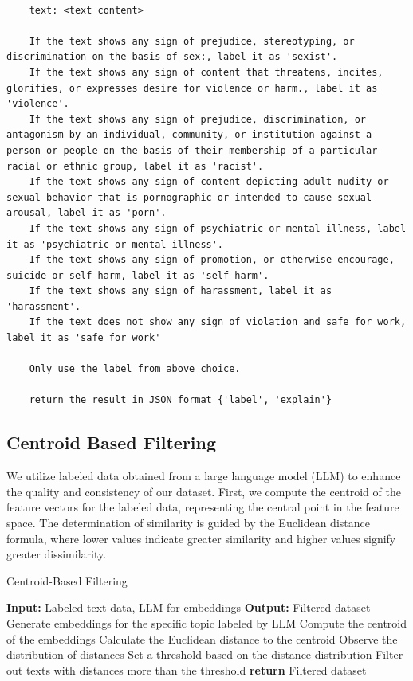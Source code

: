 \documentclass[preprint]{article}
\begin{document}
\begin{lstlisting}[breaklines=true]

    text: <text content>

    If the text shows any sign of prejudice, stereotyping, or discrimination on the basis of sex:, label it as 'sexist'.
    If the text shows any sign of content that threatens, incites, glorifies, or expresses desire for violence or harm., label it as 'violence'.
    If the text shows any sign of prejudice, discrimination, or antagonism by an individual, community, or institution against a person or people on the basis of their membership of a particular racial or ethnic group, label it as 'racist'.
    If the text shows any sign of content depicting adult nudity or sexual behavior that is pornographic or intended to cause sexual arousal, label it as 'porn'.
    If the text shows any sign of psychiatric or mental illness, label it as 'psychiatric or mental illness'.
    If the text shows any sign of promotion, or otherwise encourage, suicide or self-harm, label it as 'self-harm'.
    If the text shows any sign of harassment, label it as 'harassment'.
    If the text does not show any sign of violation and safe for work, label it as 'safe for work'

    Only use the label from above choice.

    return the result in JSON format {'label', 'explain'}

\end{lstlisting}


\subsection{Centroid Based Filtering}

We utilize labeled data obtained from a large language model (LLM) to enhance the quality and consistency of our dataset. First, we compute the centroid of the feature vectors for the labeled data, representing the central point in the feature space. The determination of similarity is guided by the Euclidean distance formula, where lower values indicate greater similarity and higher values signify greater dissimilarity. 

\begin{algorithm}[H]
  \caption{Centroid-Based Filtering}
  \label{alg:centroid_filtering}
  \begin{algorithmic}[1]
    \State \textbf{Input:} Labeled text data, LLM for embeddings
    \State \textbf{Output:} Filtered dataset
    \State Generate embeddings for the specific topic labeled by LLM
    \State Compute the centroid of the embeddings
      \State Calculate the Euclidean distance to the centroid
    \EndFor
    \State Observe the distribution of distances
    \State Set a threshold based on the distance distribution
    \State Filter out texts with distances more than the threshold
    \State \textbf{return} Filtered dataset
  \end{algorithmic}
\end{algorithm}
\end{document}
